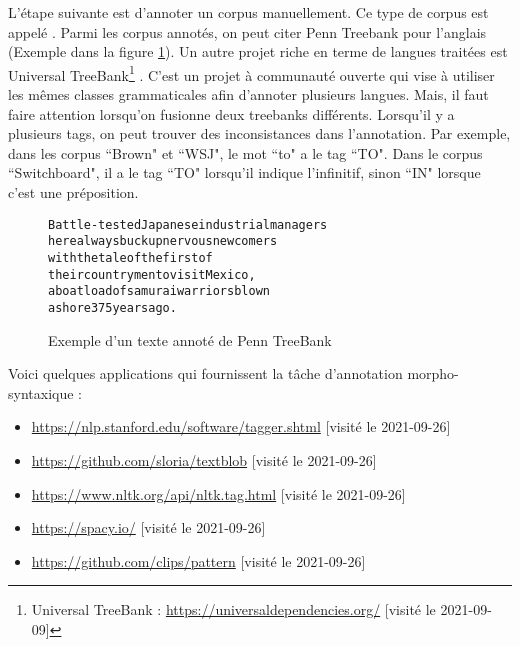 \documentclass{KodeBook}
\begin{document}
L'étape suivante est d'annoter un corpus manuellement. 
Ce type de corpus est appelé .
Parmi les corpus annotés, on peut citer Penn Treebank pour l'anglais (Exemple dans la figure \ref{fig:penn-exp}).
Un autre projet riche en terme de langues traitées est Universal TreeBank\footnote{Universal TreeBank : \url{https://universaldependencies.org/} [visité le 2021-09-09]} \cite{2012-petrov-al}. 
C'est un projet à communauté ouverte qui vise à utiliser les mêmes classes grammaticales afin d'annoter plusieurs langues. 
Mais, il faut faire attention lorsqu'on fusionne deux treebanks différents. 
Lorsqu'il y a plusieurs tags, on peut trouver des inconsistances dans l'annotation.
Par exemple, dans les corpus ``Brown" et ``WSJ", le mot ``to" a le tag ``TO". 
Dans le corpus ``Switchboard", il a le tag ``TO" lorsqu'il indique l'infinitif, sinon ``IN" lorsque c'est une préposition.
%
\begin{figure}
	\centering
	\begin{tcolorbox}[boxrule=0.4pt,text width=.7\textwidth]
		\footnotesize
		\begin{alltt}
			Battle-tested Japanese industrial managers
			here always buck up nervous newcomers
			with the tale of the first of
			their countrymen to visit Mexico ,\keyword{/,}
			a boatload of samurai warriors blown
			ashore 375 years ago .
		\end{alltt}
	\end{tcolorbox}
	\caption[Exemple d'un texte annoté de Penn TreeBank]{Exemple d'un texte annoté de Penn TreeBank \cite{2003-taylor}\label{fig:penn-exp}}
\end{figure}

Voici quelques applications qui fournissent la tâche d'annotation morpho-syntaxique :
\begin{itemize}
	\item \url{https://nlp.stanford.edu/software/tagger.shtml} [visité le 2021-09-26]
	\item \url{https://github.com/sloria/textblob} [visité le 2021-09-26]
	\item \url{https://www.nltk.org/api/nltk.tag.html} [visité le 2021-09-26]
	\item \url{https://spacy.io/} [visité le 2021-09-26]
	\item \url{https://github.com/clips/pattern} [visité le 2021-09-26]
\end{itemize}
\end{document}
